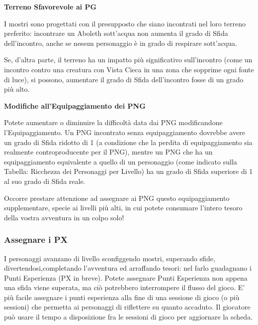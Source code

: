 \begin{multicols}{2}
\medskip

\textbf{Terreno Sfavorevole ai PG}

I mostri sono progettati con il presupposto che siano incontrati nel loro terreno preferito: incontrare un Aboleth sott'acqua non aumenta il grado di Sfida dell'incontro, anche se nessun personaggio è in grado di respirare sott'acqua.

Se, d'altra parte, il terreno ha un impatto più significativo sull'incontro (come un incontro contro una creatura con Vista Cieca in una zona che sopprime ogni fonte di luce), si possono, aumentare il grado di Sfida dell'incontro fosse di un grado più alto.

\medskip

\textbf{Modifiche all'Equipaggiamento dei PNG}

Potete aumentare o diminuire la difficoltà data dai PNG modificandone l'Equipaggiamento. Un PNG incontrato senza equipaggiamento dovrebbe avere un grado di Sfida ridotto di 1 (a condizione che la perdita di equipaggiamento sia realmente controproducente per il PNG), mentre un PNG che ha un equipaggiamento equivalente a quello di un personaggio (come indicato sulla Tabella: Ricchezza dei Personaggi per Livello) ha un grado di Sfida superiore di 1 al suo grado di Sfida reale.

Occorre prestare attenzione ad assegnare ai PNG questo equipaggiamento supplementare, specie ai livelli più alti, in cui potete consumare l'intero tesoro della vostra avventura in un colpo solo!

\subsubsection{Assegnare i PX}\label{assegnarepuntiesperienza}

I personaggi avanzano di livello sconfiggendo mostri, superando sfide, divertendosi,completando l'avventura ed arraffando tesori: nel farlo guadagnano i Punti Esperienza (PX in breve). Potete assegnare Punti Esperienza non appena una sfida viene superata, ma ciò potrebbero interrompere il flusso del gioco. E' più facile assegnare i punti esperienza alla fine di una sessione di gioco (o più sessioni) che permetta ai personaggi di riflettere su quanto accaduto. Il giocatore può usare il tempo a disposizione fra le sessioni di gioco per aggiornare la scheda.



\end{multicols}
